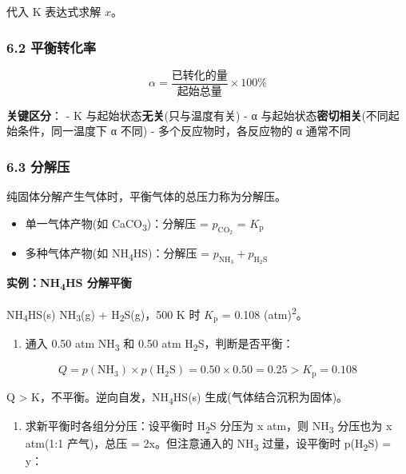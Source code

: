 代入 K 表达式求解 \(x\)。

\subsubsection{6.2 平衡转化率}\label{ux5e73ux8861ux8f6cux5316ux7387}

\[
\alpha = \frac{\text{已转化的量}}{\text{起始总量}} \times 100\%
\]

\textbf{关键区分}：
- K 与起始状态\textbf{无关}(只与温度有关)
- α 与起始状态\textbf{密切相关}(不同起始条件，同一温度下 α 不同)
- 多个反应物时，各反应物的 α 通常不同

\subsubsection{6.3 分解压}\label{ux5206ux89e3ux538b}

纯固体分解产生气体时，平衡气体的总压力称为分解压。

\begin{itemize}
\tightlist
\item
  单一气体产物(如 CaCO\textsubscript{3})：分解压 = \(p_{\mathrm{CO_2}}\) = \(K_{\mathrm p}\)
\item
  多种气体产物(如 NH\textsubscript{4}HS)：分解压 = \(p_{\mathrm{NH_3}} + p_{\mathrm{H_2S}}\)
\end{itemize}

\textbf{实例：NH\textsubscript{4}HS 分解平衡}

NH\textsubscript{4}HS(s) \衡 NH\textsubscript{3}(g) + H\textsubscript{2}S(g)，500 K 时 \(K_{\mathrm p}\) = 0.108 (atm)\textsuperscript{2}。

\begin{enumerate}
\def\labelenumi{(\alph{enumi})}
\tightlist
\item
  通入 0.50 atm NH\textsubscript{3} 和 0.50 atm H\textsubscript{2}S，判断是否平衡：
\end{enumerate}

\[
Q = p(\mathrm{NH_3}) \times p(\mathrm{H_2S}) = 0.50 \times 0.50 = 0.25 > K_{\mathrm p} = 0.108
\]

Q \textgreater{} K，不平衡。逆向自发，NH\textsubscript{4}HS(s) 生成(气体结合沉积为固体)。

\begin{enumerate}
\def\labelenumi{(\alph{enumi})}
\setcounter{enumi}{1}
\tightlist
\item
  求新平衡时各组分分压：设平衡时 H\textsubscript{2}S 分压为 x atm，则 NH\textsubscript{3} 分压也为 x atm(1:1 产气)，总压 = 2x。但注意通入的 NH\textsubscript{3} 过量，设平衡时 p(H\textsubscript{2}S) = y：
\end{enumerate}

